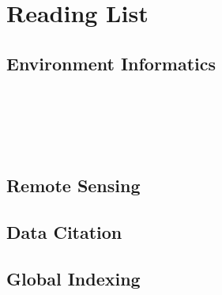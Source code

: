 \documentclass[a4paper,10pt]{article}
\begin{document}
\newpage
\section{Reading List}

\subsection{Environment Informatics}
\cite{Frew2012} \\
\cite{Foster2017} \\
\cite{Frew2004} \\
\cite{Hey2009} \\


\subsection{Remote Sensing}

\subsection{Data Citation}
\cite{Silvello2017}

\subsection{Global Indexing}
\cite{Dutton1984} \\
\cite{Samet1988} \\ 
\cite{Dutton1989} \\
\cite{Samet1990} \\
\cite{Fekete1990a, Fekete1990} \\
\cite{Samet1990} \\
\cite{Goodchild1992a} \\
\cite{Barret1995} \\
\cite{Lugo1995} \\
\cite{Dutton1996} \\
\cite{Kunszt2000} \\
\cite{Kunszt2001} \\
\cite{Goodchild2002} \\
\cite{Szalay2002} \\
\cite{Thakar2003} \\
\cite{Szalay2005} \\
\cite{Planthaber2012, Planthaber2012b}
\cite{Kondor2014} \\
\cite{Krcal2015} \\
\cite{Hausen2016} \\
\cite{Doan2016} \\
\cite{Rilee2016} \\
\cite{Kuo2017} \\
\cite{OpenGeospatialConsortium2017} \\
\end{document}
